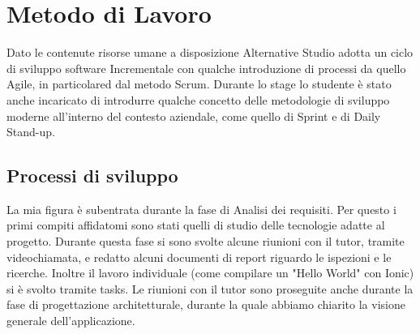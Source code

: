 



\section{Metodo di Lavoro}
Dato le contenute risorse umane a disposizione Alternative Studio adotta un ciclo di sviluppo software \gls{Incrementale} con qualche
introduzione di processi da quello \gls{Agile}, in particolared dal metodo \gls{Scrum}. Durante lo stage lo studente è stato anche
incaricato di introdurre qualche concetto delle metodologie di sviluppo moderne all'interno del contesto aziendale, come quello di
\gls{Sprint} e di \gls{Daily Stand-up}.

\subsection{Processi di sviluppo}
La mia figura è subentrata durante la fase di Analisi dei requisiti. Per questo i primi compiti affidatomi sono stati quelli di studio delle
tecnologie adatte al progetto. Durante questa fase si sono svolte alcune riunioni con il tutor, tramite videochiamata,
e redatto alcuni documenti di report riguardo le ispezioni e le ricerche. Inoltre il lavoro individuale (come compilare un "Hello World" con Ionic) si è svolto
tramite tasks. Le riunioni con il tutor sono proseguite anche durante la fase di progettazione architetturale, durante la quale abbiamo
chiarito la visione generale dell'applicazione.

